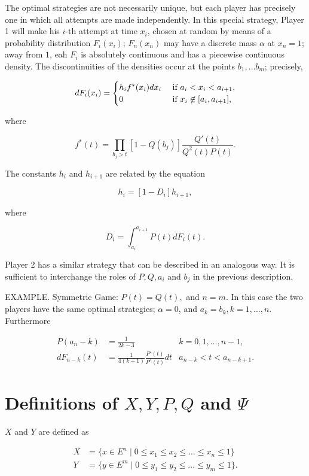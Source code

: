 \documentclass{article}
\begin{document}
The optimal strategies are not necessarily unique, but each player has
precisely one in which all attempts are made independently. In this special
strategy, Player 1 will make his $i$-th attempt at time $x_i$, chosen at random
by means of a probability distribution $F_i(x_i)$; $F_n(x_n)$ may have a
discrete mass $\alpha$ at $x_n = 1$; away from $1$, eah $F_i$ is absolutely
continuous and has a piecewise continuous density. The discontinuities of the
densities occur at the points $b_1, \dots b_m$; precisely,

\[
dF_i(x_i) = \begin{cases}
h_i f^*(x_i) dx_i & \textup{ if } a_i < x_i < a_{i+1}, \\
0                 & \textup{ if } x_i \not \in [a_i, a_{i+1}], \\
\end{cases}
\]

where

\[
f^*(t) = \prod_{b_j > t} \left [ 1 - Q(b_j) \right ] \frac{Q'(t)}{Q^2(t) P(t)}.
\]

The constants $h_i$ and $h_{i+1}$ are related by the equation

\[
h_i = [1 - D_i] h_{i+1},
\]

where

\[
D_i = \int_{a_i}^{a_{i+1}} P(t) dF_i(t).
\]

Player 2 has a similar strategy that can be described in an analogous way. It
is sufficient to interchange the roles of $P, Q, a_i$ and $b_j$ in the previous
description.

EXAMPLE. Symmetric Game: $P(t) = Q(t),$ and $n = m$. In this case the two
players have the same optimal strategies; $\alpha = 0$, and $a_k = b_k, k=1,
\dots, n$. Furthermore

\[
\begin{aligned}
P(a_n-k) &= \frac{1}{2k-3} & k = 0, 1, \dots, n-1, \\
dF_{n-k}(t) &= \frac{1}{4(k+1)} \frac{P'(t)}{P^3(t)} dt & a_{n-k} < t <
a_{n-k+1}.
\end{aligned}
\]

\section{Definitions of $X, Y, P, Q$ and $\Psi$}

$X$ and $Y$ are defined as

\[
\begin{aligned}
   X &= \{ x \in E^n \mid 0 \leq x_1 \leq x_2 \leq \dots \leq x_n \leq 1 \} \\
   Y &= \{ y \in E^m \mid 0 \leq y_1 \leq y_2 \leq \dots \leq y_m \leq 1 \}.
\end{aligned}
\]
\end{document}
